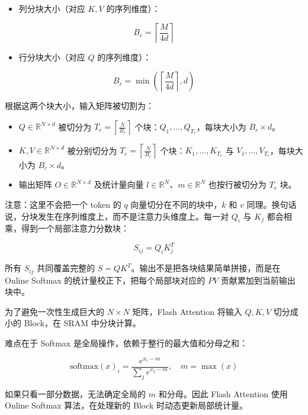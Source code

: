 \begin{itemize}
\tightlist
\item
{}
  列分块大小（对应 \(K,V\) 的序列维度）：
\end{itemize}

\[
B_c = \left\lceil \frac{M}{4d} \right\rceil
\]

\begin{itemize}
\tightlist
\item
{}
  行分块大小（对应 \(Q\) 的序列维度）：
\end{itemize}

\[
B_r = \min\left(\left\lceil \frac{M}{4d} \right\rceil, d\right)
\]

根据这两个块大小，输入矩阵被切割为：

\begin{itemize}
\tightlist
\item
  \(Q \in \mathbb{R}^{N \times d}\) 被切分为 \(T_r = \left\lceil \frac{N}{B_r} \right\rceil\) 个块：\(Q_1,\ldots,Q_{T_r}\)，每块大小为 \(B_r \times d\)。
\item
  \(K,V \in \mathbb{R}^{N \times d}\) 被分别切分为 \(T_c = \left\lceil \frac{N}{B_c} \right\rceil\) 个块：\(K_1,\ldots,K_{T_c}\) 与 \(V_1,\ldots,V_{T_c}\)，每块大小为 \(B_c \times d\)。
\item
  输出矩阵 \(O \in \mathbb{R}^{N \times d}\) 及统计量向量 \(l \in \mathbb{R}^N\)、\(m \in \mathbb{R}^N\) 也按行被切分为 \(T_r\) 块。
\end{itemize}

注意：这里不会把一个 token 的 \(q\) 向量切分在不同的块中，\(k\) 和 \(v\) 同理。换句话说，分块发生在序列维度上，而不是注意力头维度上。每一对 \(Q_i\) 与 \(K_j\) 都会相乘，得到一个局部注意力分数块：

\[
S_{ij} = Q_iK_j^T
\]

所有 \(S_{ij}\) 共同覆盖完整的 \(S = QK^T\)。输出不是把各块结果简单拼接，而是在 Online Softmax 的统计量校正下，把每个局部块对应的 \(PV\) 贡献累加到当前输出块中。

为了避免一次性生成巨大的 \(N \times N\) 矩阵，Flash Attention 将输入 \(Q,K,V\) 切分成小的 Block，在 SRAM 中分块计算。

难点在于 Softmax 是全局操作，依赖于整行的最大值和分母之和：

\[
\mathrm{softmax}(x)_i = \frac{e^{x_i-m}}{\sum_j e^{x_j-m}},\quad m = \max(x)
\]

如果只看一部分数据，无法确定全局的 \(m\) 和分母。因此 Flash Attention 使用 Online Softmax 算法，在处理新的 Block 时动态更新局部统计量。

